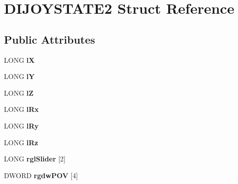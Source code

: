\hypertarget{struct_d_i_j_o_y_s_t_a_t_e2}{\section{D\-I\-J\-O\-Y\-S\-T\-A\-T\-E2 Struct Reference}
\label{struct_d_i_j_o_y_s_t_a_t_e2}
}
\subsection*{Public Attributes}
\begin{DoxyCompactItemize}
\item 
\hypertarget{struct_d_i_j_o_y_s_t_a_t_e2_a9ecd12dc69d0036a6f71f20a0c879833}{L\-O\-N\-G {\bfseries l\-X}}\label{struct_d_i_j_o_y_s_t_a_t_e2_a9ecd12dc69d0036a6f71f20a0c879833}

\item 
\hypertarget{struct_d_i_j_o_y_s_t_a_t_e2_ac8145ea13fa68130278de8efd42c11ae}{L\-O\-N\-G {\bfseries l\-Y}}\label{struct_d_i_j_o_y_s_t_a_t_e2_ac8145ea13fa68130278de8efd42c11ae}

\item 
\hypertarget{struct_d_i_j_o_y_s_t_a_t_e2_a4f6e5178a27d85cd1bf6880fc7499974}{L\-O\-N\-G {\bfseries l\-Z}}\label{struct_d_i_j_o_y_s_t_a_t_e2_a4f6e5178a27d85cd1bf6880fc7499974}

\item 
\hypertarget{struct_d_i_j_o_y_s_t_a_t_e2_a1ef895c8556a7324080a76f0b20bf744}{L\-O\-N\-G {\bfseries l\-Rx}}\label{struct_d_i_j_o_y_s_t_a_t_e2_a1ef895c8556a7324080a76f0b20bf744}

\item 
\hypertarget{struct_d_i_j_o_y_s_t_a_t_e2_a08d11d80e53d96e47794f748a2a6f546}{L\-O\-N\-G {\bfseries l\-Ry}}\label{struct_d_i_j_o_y_s_t_a_t_e2_a08d11d80e53d96e47794f748a2a6f546}

\item 
\hypertarget{struct_d_i_j_o_y_s_t_a_t_e2_a9668dce790717c3808b78c17f8fc815f}{L\-O\-N\-G {\bfseries l\-Rz}}\label{struct_d_i_j_o_y_s_t_a_t_e2_a9668dce790717c3808b78c17f8fc815f}

\item 
\hypertarget{struct_d_i_j_o_y_s_t_a_t_e2_aa259727328b7e7160dc3d0be6c1b922b}{L\-O\-N\-G {\bfseries rgl\-Slider} \mbox{[}2\mbox{]}}\label{struct_d_i_j_o_y_s_t_a_t_e2_aa259727328b7e7160dc3d0be6c1b922b}

\item 
\hypertarget{struct_d_i_j_o_y_s_t_a_t_e2_a610bd18d9dd171df8408ea8db7b699c6}{D\-W\-O\-R\-D {\bfseries rgdw\-P\-O\-V} \mbox{[}4\mbox{]}}\label{struct_d_i_j_o_y_s_t_a_t_e2_a610bd18d9dd171df8408ea8db7b699c6}


\end{DoxyCompactItemize}
